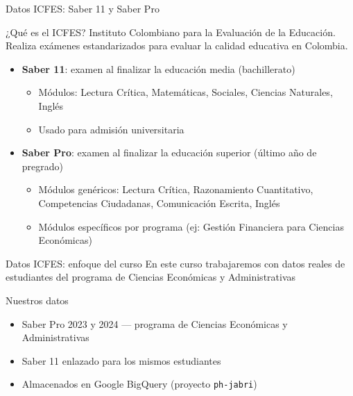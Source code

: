 \documentclass[aspectratio=169, 11pt]{beamer}
\begin{document}
\begin{frame}{Datos ICFES: Saber 11 y Saber Pro}
\begin{block}{¿Qué es el ICFES?}
Instituto Colombiano para la Evaluación de la Educación. Realiza exámenes estandarizados para evaluar la calidad educativa en Colombia.
\end{block}

\begin{itemize}
\item \textbf{Saber 11}: examen al finalizar la educación media (bachillerato)
  \begin{itemize}
  \item Módulos: Lectura Crítica, Matemáticas, Sociales, Ciencias Naturales, Inglés
  \item Usado para admisión universitaria
  \end{itemize}
\item \textbf{Saber Pro}: examen al finalizar la educación superior (último año de pregrado)
  \begin{itemize}
  \item Módulos genéricos: Lectura Crítica, Razonamiento Cuantitativo, Competencias Ciudadanas, Comunicación Escrita, Inglés
  \item Módulos específicos por programa (ej: Gestión Financiera para Ciencias Econ\'omicas)
  \end{itemize}
\end{itemize}
\end{frame}

\begin{frame}{Datos ICFES: enfoque del curso}
\alert{En este curso trabajaremos con datos reales de estudiantes del programa de Ciencias Econ\'omicas y Administrativas}

\vspace{1em}
\begin{exampleblock}{Nuestros datos}
\begin{itemize}
\item Saber Pro 2023 y 2024 --- programa de Ciencias Econ\'omicas y Administrativas
\item Saber 11 enlazado para los mismos estudiantes
\item Almacenados en Google BigQuery (proyecto \texttt{ph-jabri})
\end{itemize}
\end{exampleblock}
\end{frame}
\end{document}
